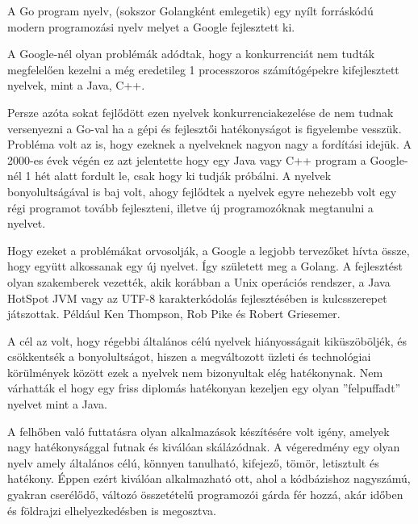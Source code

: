 
A Go program nyelv, (sokszor Golangként emlegetik) egy nyílt forráskódú modern programozási nyelv melyet a Google fejlesztett ki.

A Google-nél olyan problémák adódtak, hogy a konkurrenciát nem tudták megfelelően kezelni a még eredetileg
1 processzoros számítógépekre kifejlesztett nyelvek, mint a Java, C++.

Persze azóta sokat fejlődött ezen nyelvek konkurrenciakezelése de nem tudnak versenyezni a Go-val
ha a gépi és fejlesztői hatékonyságot is figyelembe vesszük.
Probléma volt az is, hogy ezeknek a nyelveknek nagyon nagy a fordítási idejük. A 2000-es évek végén ez azt jelentette
hogy egy Java vagy C++ program a Google-nél 1 hét alatt fordult le, csak hogy ki tudják próbálni.
A nyelvek bonyolultságával is baj volt, ahogy fejlődtek a nyelvek egyre nehezebb volt egy régi programot tovább fejleszteni,
illetve új programozóknak megtanulni a nyelvet.

Hogy ezeket a problémákat orvosolják, a Google a legjobb tervezőket hívta össze, hogy együtt alkossanak egy új nyelvet.
Így született meg a Golang.
A fejlesztést olyan szakemberek vezették, akik korábban a Unix operációs rendszer, a Java HotSpot JVM
vagy az UTF-8 karakterkódolás fejlesztésében is kulcsszerepet játszottak.
Például Ken Thompson, Rob Pike és Robert Griesemer.

A cél az volt, hogy régebbi általános célú nyelvek hiányosságait kiküszöböljék, és csökkentsék a bonyolultságot,
hiszen a megváltozott üzleti és technológiai körülmények között ezek a nyelvek nem bizonyultak elég hatékonynak.
Nem várhatták el hogy egy friss diplomás hatékonyan kezeljen egy olyan ''felpuffadt'' nyelvet mint a Java.

A felhőben való futtatásra olyan alkalmazások készítésére volt igény, amelyek nagy hatékonysággal futnak és kiválóan skálázódnak.
A végeredmény egy olyan nyelv amely általános célú, könnyen tanulható, kifejező, tömör, letisztult és hatékony.
Éppen ezért kiválóan alkalmazható ott, ahol a kódbázishoz nagyszámú, gyakran cserélődő, változó összetételű programozói gárda fér hozzá,
akár időben és földrajzi elhelyezkedésben is megosztva.

